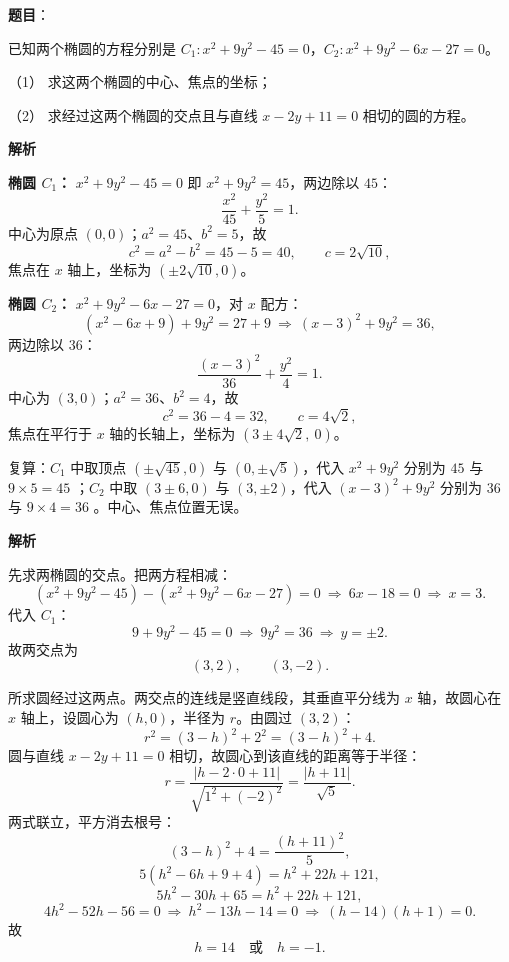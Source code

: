 \begin{answer}

\textbf{题目}：

已知两个椭圆的方程分别是 $C_1:x^2+9y^2-45=0$，$C_2:x^2+9y^2-6x-27=0$。

（1） 求这两个椭圆的中心、焦点的坐标；

（2） 求经过这两个椭圆的交点且与直线 $x-2y+11=0$ 相切的圆的方程。

\textbf{解析}


\textbf{椭圆 $C_1$：} $x^2+9y^2-45=0$ 即 $x^2+9y^2=45$，两边除以 $45$：
\nopagebreak[4]
\[
\frac{x^2}{45}+\frac{y^2}{5}=1.
\]
中心为原点 $(0,0)$；$a^2=45$、$b^2=5$，故
\nopagebreak[4]
\[
c^2=a^2-b^2=45-5=40,\qquad c=2\sqrt{10},
\]
焦点在 $x$ 轴上，坐标为 $(\pm2\sqrt{10},0)$。

\textbf{椭圆 $C_2$：} $x^2+9y^2-6x-27=0$，对 $x$ 配方：
\nopagebreak[4]
\[
(x^2-6x+9)+9y^2=27+9\ \Longrightarrow\ (x-3)^2+9y^2=36,
\]
两边除以 $36$：
\nopagebreak[4]
\[
\frac{(x-3)^2}{36}+\frac{y^2}{4}=1.
\]
中心为 $(3,0)$；$a^2=36$、$b^2=4$，故
\nopagebreak[4]
\[
c^2=36-4=32,\qquad c=4\sqrt2,
\]
焦点在平行于 $x$ 轴的长轴上，坐标为 $(3\pm4\sqrt2,\ 0)$。

复算：$C_1$ 中取顶点 $(\pm\sqrt{45},0)$ 与 $(0,\pm\sqrt5)$，代入 $x^2+9y^2$ 分别为 $45$ 与 $9\times5=45$ ；$C_2$ 中取 $(3\pm6,0)$ 与 $(3,\pm2)$，代入 $(x-3)^2+9y^2$ 分别为 $36$ 与 $9\times4=36$ 。中心、焦点位置无误。


\textbf{解析}

先求两椭圆的交点。把两方程相减：
\nopagebreak[4]
\[
(x^2+9y^2-45)-(x^2+9y^2-6x-27)=0
\ \Longrightarrow\ 6x-18=0\ \Longrightarrow\ x=3.
\]
代入 $C_1$：
\nopagebreak[4]
\[
9+9y^2-45=0\ \Longrightarrow\ 9y^2=36\ \Longrightarrow\ y=\pm2.
\]
故两交点为
\nopagebreak[4]
\[
(3,2),\qquad (3,-2).
\]

所求圆经过这两点。两交点的连线是竖直线段，其垂直平分线为 $x$ 轴，故圆心在 $x$ 轴上，设圆心为 $(h,0)$，半径为 $r$。由圆过 $(3,2)$：
\nopagebreak[4]
\[
r^2=(3-h)^2+2^2=(3-h)^2+4.
\]
圆与直线 $x-2y+11=0$ 相切，故圆心到该直线的距离等于半径：
\nopagebreak[4]
\[
r=\frac{|h-2\cdot0+11|}{\sqrt{1^2+(-2)^2}}=\frac{|h+11|}{\sqrt5}.
\]
两式联立，平方消去根号：
\nopagebreak[4]
\[
(3-h)^2+4=\frac{(h+11)^2}{5},
\]
\nopagebreak[4]
\[
5\left(h^2-6h+9+4\right)=h^2+22h+121,
\]
\nopagebreak[4]
\[
5h^2-30h+65=h^2+22h+121,
\]
\nopagebreak[4]
\[
4h^2-52h-56=0\ \Longrightarrow\ h^2-13h-14=0\ \Longrightarrow\ (h-14)(h+1)=0.
\]
故
\nopagebreak[4]
\[
h=14\quad\text{或}\quad h=-1.
\]


\end{answer}
